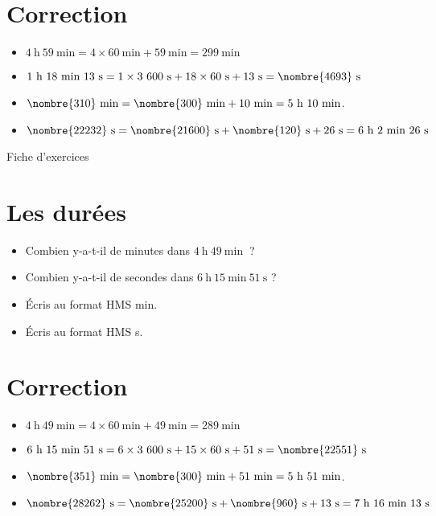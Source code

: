 \documentclass[a4paper,11pt,fleqn]{article}
\begin{document}
\section{Correction}
\begin{itemize}
 \item $4~\text{h}~59~\text{min}=4\times60~\text{min}+59~\text{min}=299~\text{min}$
  \item $1~\text{h}~18~\text{min}~13~\text{s}=1\times3~600~\text{s}+18\times60~\text{s}+13~\text{s}=\nombre{4693}~\text{s}$
  \item $\nombre{310}~\text{min}=\nombre{300}~\text{min}+10~\text{min}=5~\text{h}~10~\text{min}$.
  \item $\nombre{22232}~\text{s}=\nombre{21600}~\text{s}+\nombre{120}~\text{s}+26~\text{s}=6~\text{h}~2~\text{min}~26~\text{s}$ \end{itemize}


\newpage
\setcounter{exo}{0}
\setcounter{section}{0}
\begin{center}
	{\huge Fiche d'exercices } 	
\end{center}


\section{Les durées}
\begin{itemize}
  \item Combien y-a-t-il de minutes dans $4~\text{h}~49~\text{min}~$ ?
  \item Combien y-a-t-il de secondes dans $6~\text{h}~15~\text{min}~51~\text{s}$ ?
  \item Écris au format HMS  min.
  \item Écris au format HMS  s.
\end{itemize}

\section{Correction}
\begin{itemize}
 \item $4~\text{h}~49~\text{min}=4\times60~\text{min}+49~\text{min}=289~\text{min}$
  \item $6~\text{h}~15~\text{min}~51~\text{s}=6\times3~600~\text{s}+15\times60~\text{s}+51~\text{s}=\nombre{22551}~\text{s}$
  \item $\nombre{351}~\text{min}=\nombre{300}~\text{min}+51~\text{min}=5~\text{h}~51~\text{min}$.
  \item $\nombre{28262}~\text{s}=\nombre{25200}~\text{s}+\nombre{960}~\text{s}+13~\text{s}=7~\text{h}~16~\text{min}~13~\text{s}$ \end{itemize}
\end{document}
